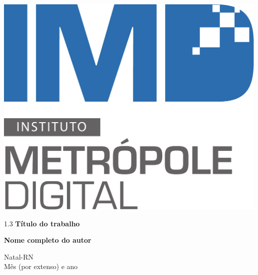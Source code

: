 \begin{titlepage}
\begin{center}
\begin{minipage}{2.2cm}
\begin{center}
				\includegraphics[scale=0.1]{Imagens/Logotipo-IMD}
			\end{center}
		\end{minipage}
			
		\vspace{6cm}
						
		{\setlength{\baselineskip}%
		{1.3\baselineskip}
		{\LARGE \textbf{Título do trabalho}}\par}
			
		\vspace{3cm}
			
		{\large \textbf{Nome completo do autor}}
						
		\vspace{6cm}
		
		Natal-RN\\Mês (por extenso) e ano
	\end{center}
\end{titlepage}